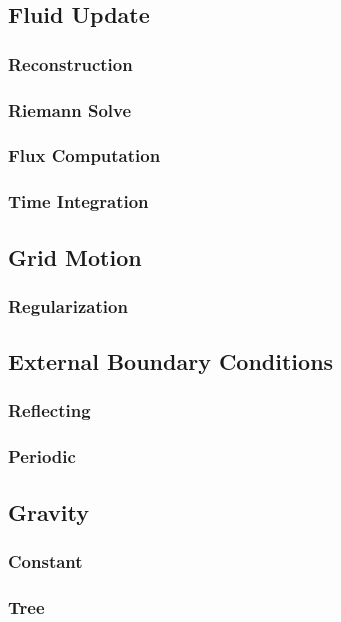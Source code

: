 \subsection{Fluid Update}
\subsubsection{Reconstruction}
\subsubsection{Riemann Solve}
\subsubsection{Flux Computation}
\subsubsection{Time Integration}

\subsection{Grid Motion}
\subsubsection{Regularization}

\subsection{External Boundary Conditions}
\subsubsection{Reflecting}
\subsubsection{Periodic}

\subsection{Gravity}
\subsubsection{Constant}
\subsubsection{Tree}

